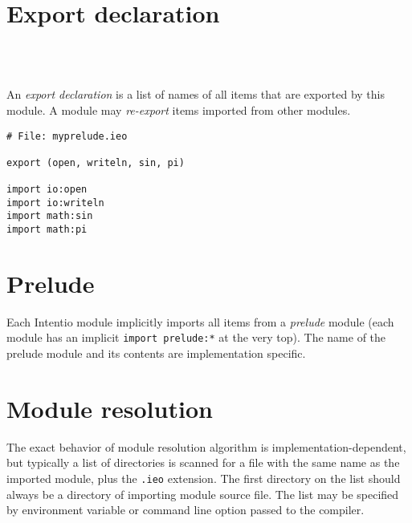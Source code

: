 \section{Export declaration}

\begin{bnf}
   \eq {} \ \term{(} \  \ \term{)} \\
   \eq {} \  \ \gtry{\term{,}}
\end{bnf}

An \emph{export declaration} is a list of names of all items that are exported by this module. A module may \emph{re-export} items imported from other modules.

\begin{example}[Re-exporting]
\begin{lstlisting}
# File: myprelude.ieo

export (open, writeln, sin, pi)

import io:open
import io:writeln
import math:sin
import math:pi
\end{lstlisting}
\end{example}

\section{Prelude}

Each Intentio module implicitly imports all items from a \emph{prelude} module (each module has an implicit \lstinline{import prelude:*} at the very top). The name of the prelude module and its contents are implementation specific.

\section{Module resolution}

The exact behavior of module resolution algorithm is implementation-dependent, but typically a list of directories is scanned for a file with the same name as the imported module, plus the \lstinline{.ieo} extension. The first directory on the list should always be a directory of importing module source file. The list may be specified by environment variable or command line option passed to the compiler.
